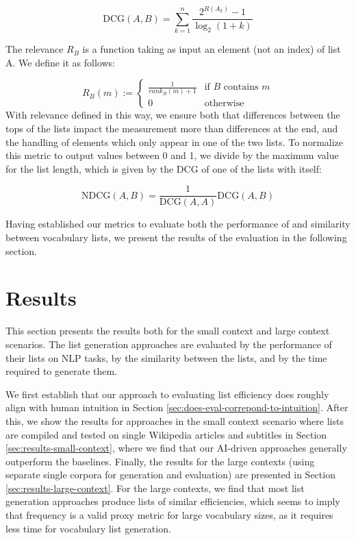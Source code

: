 



\[
	\text{DCG}(A, B) = \sum_{k=1}^{n} \frac{2^{R(A_k)} - 1}{\log_2(1 + k)}
\]

The relevance $R_B$ is a function taking as input an element (not an index) of list A.
We define it as follows:

\[
	R_B(m) :=
	\begin{cases}
		\frac{1}{rank_{B}(m) + 1} & \text{if } B \text{ contains } m \\
		0                         & \text{otherwise}
	\end{cases}
\]
With relevance defined in this way, we ensure both that differences between the tops of the lists impact the measurement more than differences at the end, and the handling of elements which only appear in one of the two lists.
To normalize this metric to output values between 0 and 1, we divide by the maximum value for the list length, which is given by the DCG of one of the lists with itself:

\[
	\text{NDCG}(A,B) = \frac{1}{\text{DCG}(A, A)} \text{DCG}(A, B)
\]

Having established our metrics to evaluate both the performance of and similarity between vocabulary lists, we present the results of the evaluation in the following section.

\section{Results} \label{sec:results}
This section presents the results both for the small context and large context scenarios.
The list generation approaches are evaluated by the performance of their lists on NLP tasks, by the similarity between the lists, and by the time required to generate them.

We first establish that our approach to evaluating list efficiency does roughly align with human intuition in Section \ref{sec:does-eval-correpond-to-intuition}.
After this, we show the results for approaches in the small context scenario where lists are compiled and tested on single Wikipedia articles and subtitles in Section \ref{sec:results-small-context}, where we find that our AI-driven approaches generally outperform the baselines.
Finally, the results for the large contexts (using separate single corpora for generation and evaluation) are presented in Section \ref{sec:results-large-context}.
For the large contexts, we find that most list generation approaches produce lists of similar efficiencies, which seems to imply that frequency is a valid proxy metric for large vocabulary sizes, as it requires less time for vocabulary list generation. 

